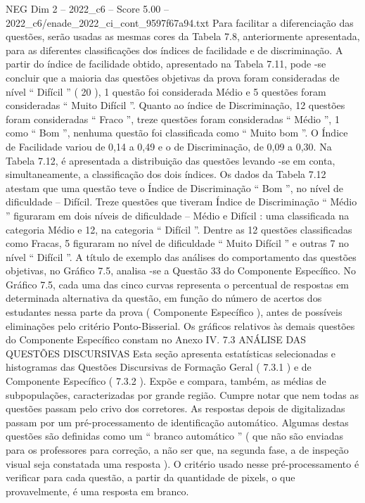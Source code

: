 \begin{textsample}{NEG Dim 2 – 2022\_c6 – Score 5.00 – 2022\_c6/enade\_2022\_ci\_cont\_9597f67a94.txt}
Para facilitar a diferenciação das questões, serão usadas as mesmas cores da Tabela 7.8, anteriormente apresentada, para as diferentes classificações dos índices de facilidade e de discriminação.
A partir do índice de facilidade obtido, apresentado na Tabela 7.11, pode -se concluir que a maioria das questões objetivas da prova foram consideradas de nível “ Difícil ” ( 20 ), 1 questão foi considerada Médio e 5 questões foram consideradas “ Muito Difícil ”.
Quanto ao índice de Discriminação, 12 questões foram consideradas “ Fraco ”, treze questões foram consideradas “ Médio ”, 1 como “ Bom ”, nenhuma questão foi classificada como “ Muito bom ”.
O Índice de Facilidade variou de 0,14 a 0,49 e o de Discriminação, de 0,09 a 0,30.
Na Tabela 7.12, é apresentada a distribuição das questões levando -se em conta, simultaneamente, a classificação dos dois índices.
Os dados da Tabela 7.12 atestam que uma questão teve o Índice de Discriminação “ Bom ”, no nível de dificuldade – Difícil.
Treze questões que tiveram Índice de Discriminação “ Médio ” figuraram em dois níveis de dificuldade – Médio e Difícil : uma classificada na categoria Médio e 12, na categoria “ Difícil ”.
Dentre as 12 questões classificadas como Fracas, 5 figuraram no nível de dificuldade “ Muito Difícil ” e outras 7 no nível “ Difícil ”.
A título de exemplo das análises do comportamento das questões objetivas, no Gráfico 7.5, analisa -se a Questão 33 do Componente Específico.
No Gráfico 7.5, cada uma das cinco curvas representa o percentual de respostas em determinada alternativa da questão, em função do número de acertos dos estudantes nessa parte da prova ( Componente Específico ), antes de possíveis eliminações pelo critério Ponto-Bisserial.
Os gráficos relativos às demais questões do Componente Específico constam no Anexo IV. 7.3 ANÁLISE DAS QUESTÕES DISCURSIVAS Esta seção apresenta estatísticas selecionadas e histogramas das Questões Discursivas de Formação Geral ( 7.3.1 ) e de Componente Específico ( 7.3.2 ).
Expõe e compara, também, as médias de subpopulações, caracterizadas por grande região.
Cumpre notar que nem todas as questões passam pelo crivo dos corretores.
As respostas depois de digitalizadas passam por um pré-processamento de identificação automático.
Algumas destas questões são definidas como um “ branco automático ” ( que não são enviadas para os professores para correção, a não ser que, na segunda fase, a de inspeção visual seja constatada uma resposta ).
O critério usado nesse pré-processamento é verificar para cada questão, a partir da quantidade de pixels, o que provavelmente, é uma resposta em branco.

\end{textsample}
